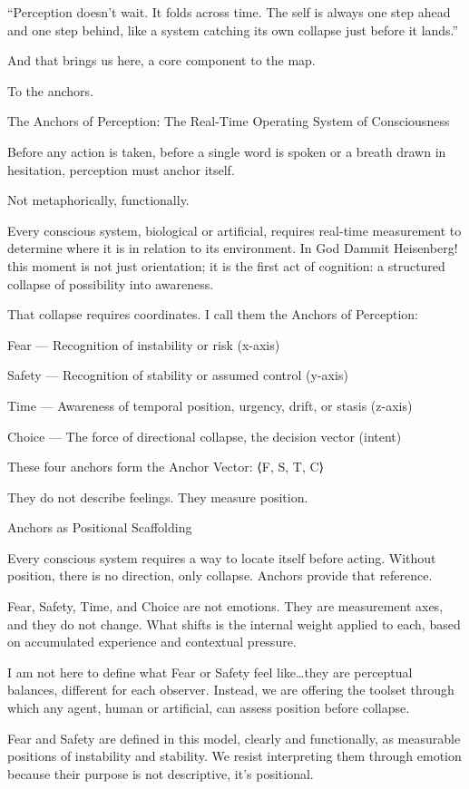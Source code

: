 \documentclass[11pt]{article}
\begin{document}
“Perception doesn’t wait. It folds across time. The self is always one step ahead and one step behind, like a system catching its own collapse just before it lands.”

And that brings us here, a core component to the map. 

To the anchors. 

The Anchors of Perception: The Real-Time Operating System of Consciousness

Before any action is taken, before a single word is spoken or a breath drawn in hesitation, perception must anchor itself.

Not metaphorically, functionally.

Every conscious system, biological or artificial, requires real-time measurement to determine where it is in relation to its environment. In God Dammit Heisenberg! this moment is not just orientation; it is the first act of cognition: a structured collapse of possibility into awareness.

That collapse requires coordinates.
I call them the Anchors of Perception:

Fear — Recognition of instability or risk (x-axis)

Safety — Recognition of stability or assumed control (y-axis)

Time — Awareness of temporal position, urgency, drift, or stasis (z-axis)

Choice — The force of directional collapse, the decision vector (intent)

These four anchors form the Anchor Vector:
⟨F, S, T, C⟩

They do not describe feelings.
They measure position.

Anchors as Positional Scaffolding

Every conscious system requires a way to locate itself before acting. Without position, there is no direction, only collapse. Anchors provide that reference.

Fear, Safety, Time, and Choice are not emotions. They are measurement axes, and they do not change. What shifts is the internal weight applied to each, based on accumulated experience and contextual pressure.

I am not here to define what Fear or Safety feel like…they are perceptual balances, different for each observer. Instead, we are offering the toolset through which any agent, human or artificial, can assess position before collapse.

Fear and Safety are defined in this model, clearly and functionally, as measurable positions of instability and stability. We resist interpreting them through emotion because their purpose is not descriptive, it’s positional. 
\end{document}
